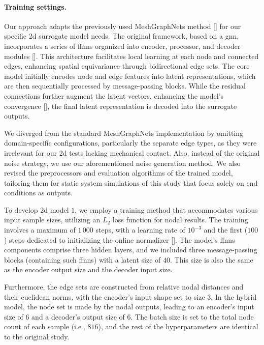 \documentclass[12pt,a4paper]{report}
\begin{document}
\paragraph{Training settings.} Our approach adapts the previously used MeshGraphNets method [\cite{pfaff2021}] for our specific \ac{2d} surrogate model needs. The original framework, based on a \ac{gnn}, incorporates a series of \acp{ffnn} organized into encoder, processor, and decoder modules [\cite{sanchez2020,battaglia2018}]. This architecture facilitates local learning at each node and connected edges, enhancing spatial equivariance through bidirectional edge sets. The core model initially encodes node and edge features into latent representations, which are then sequentially processed by message-passing blocks. While the residual connections further augment the latent vectors, enhancing the model's convergence [\cite{sanchez2020}], the final latent representation is decoded into the surrogate outputs.

We diverged from the standard MeshGraphNets implementation by omitting domain-specific configurations, particularly the separate edge types, as they were irrelevant for our \ac{2d} tests lacking mechanical contact. Also, instead of the original noise strategy, we use our aforementioned noise generation method. We also revised the preprocessors and evaluation algorithms of the trained model, tailoring them for static system simulations of this study that focus solely on end conditions as outputs.

To develop \ac{2d} model $1$, we employ a training method that accommodates various input sample sizes, utilizing an $L_2$ loss function for nodal results. The training involves a maximum of $1\,000$ steps, with a learning rate of $10^{-3}$ and the first ($100$) steps dedicated to initializing the online normalizer [\cite{sanchez2020}]. The model's \acp{ffnn} components comprise three hidden layers, and we included three message-passing blocks (containing such \acp{ffnn}) with a latent size of $40$.  This size is also the same as the encoder output size and the decoder input size.

Furthermore, the edge sets are constructed from relative nodal distances and their euclidean norms, with the encoder's input shape set to size $3$. In the hybrid model, the node set is made by the nodal outputs, leading to an encoder's input size of $6$ and a decoder's output size of $6$. The batch size is set to the total node count of each sample (i.e., $816$), and the rest of the hyperparameters are identical to the original study.
\end{document}
